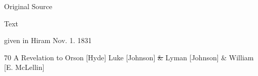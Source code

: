 {				%
			
			\begin{description}
				\item[Original Source]
			\end{description}
			
			
			\begin{description}
				\item[Text]
			\end{description}
			
				given in Hiram Nov. 1. 1831
				
				\begin{tightcenter}
				70 A Revelation to Orson [Hyde] Luke [Johnson] \sout{\&} Lyman [Johnson] \& William [E. McLellin]
				\end{tightcenter}
				
}
